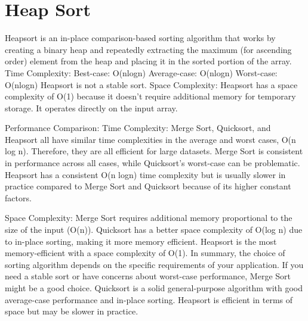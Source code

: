 \documentclass[12pt]{article}
\begin{document}
\newpage
\section{Heap Sort}
Heapsort is an in-place comparison-based sorting algorithm that works by creating a binary heap and repeatedly extracting the maximum (for ascending order) element from the heap and placing it in the sorted portion of the array.
Time Complexity:
Best-case: O(nlogn)
Average-case: O(nlogn)
Worst-case: O(nlogn)
Heapsort is not a stable sort.
Space Complexity:
Heapsort has a space complexity of O(1) because it doesn’t require additional memory for temporary storage. It operates directly on the input array.

Performance Comparison:
Time Complexity:
Merge Sort, Quicksort, and Heapsort all have similar time complexities in the average and worst cases, O(n log n). Therefore, they are all efficient for large datasets. Merge Sort is consistent in performance across all cases, while Quicksort’s worst-case can be problematic. Heapsort has a consistent O(n logn) time complexity but is usually slower in practice compared to Merge Sort and Quicksort because of its higher constant factors.

Space Complexity:
Merge Sort requires additional memory proportional to the size of the input (O(n)). Quicksort has a better space complexity of O(log n) due to in-place sorting, making it more memory efficient. Heapsort is the most memory-efficient with a space complexity of O(1). In summary, the choice of sorting algorithm depends on the specific requirements of your application. If you need a stable sort or have concerns about worst-case performance, Merge Sort might be a good choice. Quicksort is a solid general-purpose algorithm with good average-case performance and in-place sorting. Heapsort is efficient in terms of space but may be slower in practice.
\end{document}
